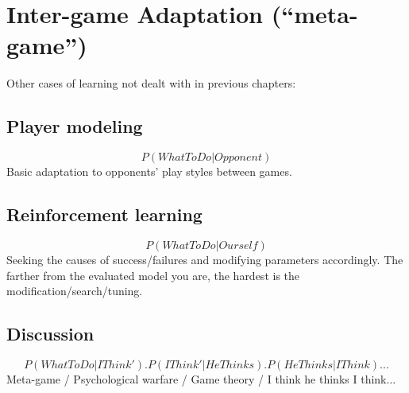 \chapter{Inter-game Adaptation (``meta-game'')}
Other cases of learning not dealt with in previous chapters:

\section{Player modeling}
$$P(WhatToDo|Opponent)$$
Basic adaptation to opponents' play styles between games.

\section{Reinforcement learning}
$$P(WhatToDo|Ourself)$$
Seeking the causes of success/failures and modifying parameters accordingly. The farther from the evaluated model you are, the hardest is the modification/search/tuning.

\section{Discussion}
$$P(WhatToDo|IThink').P(IThink'|HeThinks).P(HeThinks|IThink)...$$
Meta-game / Psychological warfare / Game theory / I think he thinks I think...



